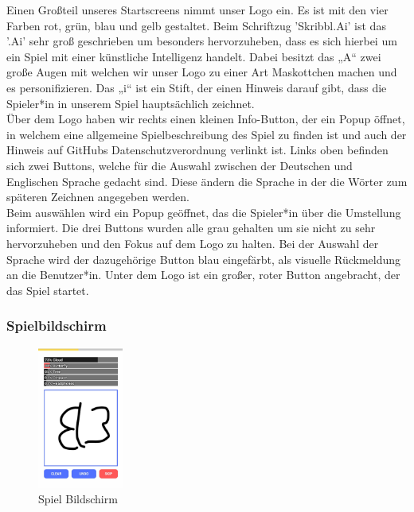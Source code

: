 \documentclass[11pt]{article}
\begin{document}
Einen Großteil unseres Startscreens nimmt unser Logo ein. Es ist mit den vier Farben rot, grün, blau und gelb gestaltet. Beim Schriftzug 'Skribbl.Ai' ist das '.Ai' sehr groß geschrieben um besonders hervorzuheben, dass es sich hierbei um ein Spiel mit einer künstliche Intelligenz handelt. Dabei besitzt das „A“ zwei große Augen mit welchen wir unser Logo zu einer Art Maskottchen machen und es  personifizieren. Das „i“ ist ein Stift, der einen Hinweis darauf gibt, dass die Spieler*in in unserem Spiel hauptsächlich zeichnet. \\
Über dem Logo haben wir rechts einen kleinen Info-Button, der ein Popup öffnet, in welchem eine allgemeine Spielbeschreibung des Spiel zu finden ist und auch der Hinweis auf GitHubs Datenschutzverordnung verlinkt ist. 
Links oben befinden sich zwei Buttons, welche für die Auswahl zwischen der Deutschen und Englischen Sprache gedacht sind. Diese ändern die Sprache in der die Wörter zum späteren Zeichnen angegeben werden.\\
Beim auswählen wird ein Popup geöffnet, das die Spieler*in über die Umstellung informiert. Die drei Buttons wurden alle grau gehalten um sie nicht zu sehr hervorzuheben und den Fokus auf dem Logo zu halten. Bei der Auswahl der Sprache wird der dazugehörige Button blau eingefärbt, als visuelle Rückmeldung an die Benutzer*in. 
Unter dem Logo ist ein großer, roter Button angebracht, der das Spiel startet.

\subsubsection{Spielbildschirm}

\begin{figure}
\centering
\includegraphics[width=0.25\textwidth]{images/Gamescreen.jpg}
\caption{\label{fig:Gamescreen}Spiel Bildschirm}
\end{figure}
\end{document}

